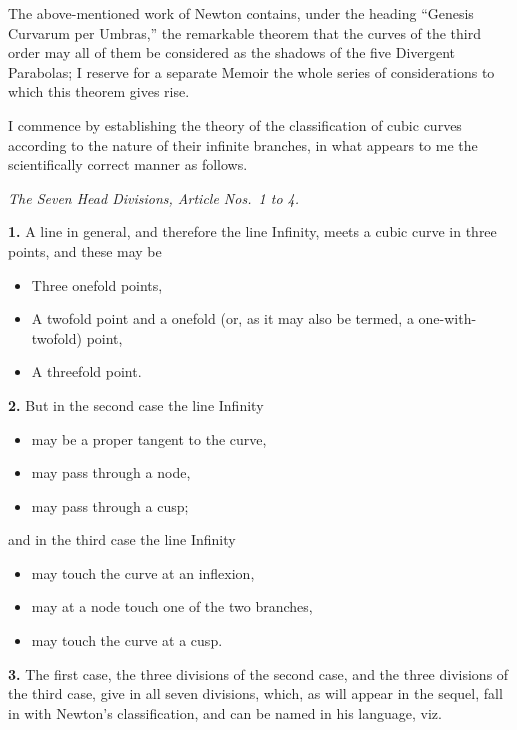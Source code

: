 \documentclass[11pt,a4paper]{article}
\begin{document}
The above-mentioned work of Newton contains, under the heading ``Genesis Curvarum per Umbras,'' the remarkable theorem that the curves of the third order may all of them be considered as the shadows of the five Divergent Parabolas; I reserve for a separate Memoir the whole series of considerations to which this theorem gives rise.

I commence by establishing the theory of the classification of cubic curves according to the nature of their infinite branches, in what appears to me the scientifically correct manner as follows.

\medskip

\noindent\textit{The Seven Head Divisions, Article Nos.\ 1 to 4.}

\medskip

\textbf{1.} A line in general, and therefore the line Infinity, meets a cubic curve in three points, and these may be
\begin{itemize}\itemsep0pt
\item Three onefold points,
\item A twofold point and a onefold (or, as it may also be termed, a one-with-twofold) point,
\item A threefold point.
\end{itemize}

\textbf{2.} But in the second case the line Infinity
\begin{itemize}\itemsep0pt
\item may be a proper tangent to the curve,
\item may pass through a node,
\item may pass through a cusp;
\end{itemize}
and in the third case the line Infinity
\begin{itemize}\itemsep0pt
\item may touch the curve at an inflexion,
\item may at a node touch one of the two branches,
\item may touch the curve at a cusp.
\end{itemize}

\textbf{3.} The first case, the three divisions of the second case, and the three divisions of the third case, give in all seven divisions, which, as will appear in the sequel, fall in with Newton's classification, and can be named in his language, viz.

\smallskip
\end{document}
